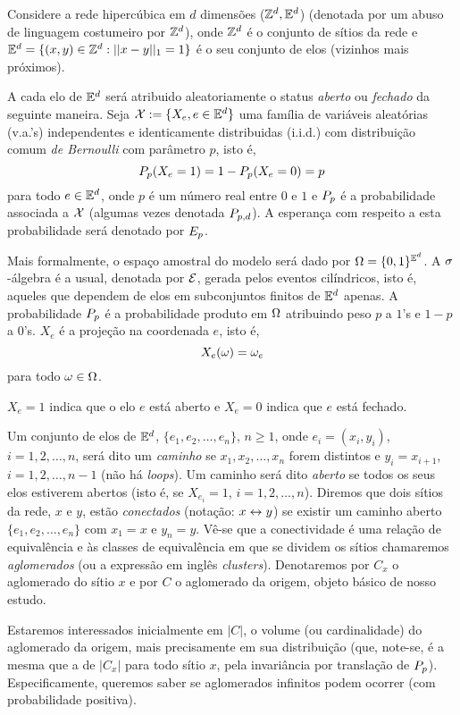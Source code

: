 Considere a rede hipercúbica em $d$ dimensões ($\mathbb{Z}^d,\mathbb{E}^d$) (denotada por um
abuso de linguagem costumeiro por $\mathbb{Z}^d$), onde $\mathbb{Z}^d$ é 
o conjunto de sítios da rede e $\mathbb{E}^d=\{(x,y)\in\mathbb{Z}^d:||x-y||_1=1\}$ é o
seu conjunto de elos (vizinhos mais próximos).

A cada elo de $\mathbb{E}^d$ será atribuido aleatoriamente o status {\em aberto} ou 
{\em fechado} da seguinte maneira. Seja ${\cal X}:=\{X_e, e\in\mathbb{E}^d\}$ uma 
família de variáveis aleatórias
(v.a.'s) independentes e identicamente distribuidas (i.i.d.) com distribuição
comum {\em de Bernoulli} com parâmetro $p$, isto é,
$$P_p(X_e=1)=1-P_p(X_e=0)=p$$ para todo $e\in\mathbb{E}^d$,
onde $p$ é um número real entre $0$ e $1$ e
$P_p$ é a probabilidade associada a ${\cal X}$ (algumas vezes denotada
$P_{p,d}$). A esperança com respeito a esta probabilidade será denotado por $E_p$.

Mais formalmente, o espaço amostral do modelo será dado por $\Omega=\{0,1\}^{\mathbb{E}^d}$.
A $\sigma$-álgebra é a usual, denotada por ${\cal E}$, gerada pelos eventos 
cilíndricos, isto é, aqueles
que dependem de elos em subconjuntos finitos de $\mathbb{E}^d$ apenas. A probabilidade
$P_p$ é a probabilidade produto em $\Omega$ atribuindo peso $p$ a $1$'s e $1-p$ a
$0$'s. $X_e$ é a projeção na coordenada $e$, isto é, $$X_e(\omega)=\omega_e$$ para
todo $\omega\in\Omega$.

$X_e=1$ indica que o elo $e$ 
está aberto e $X_e=0$ indica que $e$ está fechado.

Um conjunto de elos de $\mathbb{E}^d$, $\{e_1,e_2,\ldots,e_n\},\, n\geq1$, onde $e_i=(x_i,y_i)$,
$i=1,2,\ldots,n$, será dito um {\em caminho} se $x_1,x_2,\ldots,x_n$ forem
distintos e $y_i=x_{i+1}$, $i=1,2,\ldots,n-1$ (não há {\em loops}). 
Um caminho será dito {\em aberto}
se todos os seus elos estiverem abertos (isto é, se $X_{e_i}=1$, $i=1,2,\ldots,n$).
Diremos que dois sítios da rede, $x$ e $y$, estão {\em conectados} (notação:
$x\leftrightarrow y$) se existir um caminho aberto $\{e_1,e_2,\ldots,e_n\}$ com $x_1=x$ e $y_n=y$.
Vê-se que a conectividade é uma relação de equivalência e às classes de
equivalência em que se dividem os sítios chamaremos {\em aglomerados} (ou
a expressão em inglês
{\em clusters}). Denotaremos por $C_x$ o aglomerado do sítio $x$ e por $C$
o aglomerado da origem, objeto básico de nosso estudo.

Estaremos interessados inicialmente em $|C|$, o volume (ou cardinalidade)
do aglomerado da origem, mais precisamente em sua distribuição (que, note-se,
é a mesma que a de $|C_x|$ para todo sítio $x$, pela invariância por
translação de $P_p$). Especificamente, queremos
saber se aglomerados infinitos podem ocorrer (com probabilidade positiva).

